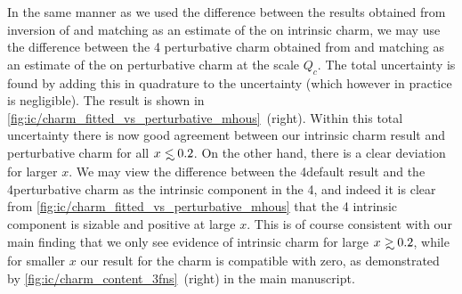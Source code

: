 In the same manner as we used the difference between the results obtained from
inversion of \nnlo and \nnnlo  matching as an estimate of the \mhou on
intrinsic charm, we may use the difference between the 4\fns
 perturbative charm obtained from \nnlo and \nnnlo matching as an
 estimate of the \mhou on perturbative charm at the scale $Q_c$.
 The total uncertainty is found by adding
 this in quadrature to the \pdf uncertainty (which however in practice
 is negligible).
%
The result is shown in 
\cref{fig:ic/charm_fitted_vs_perturbative_mhous}~(right).
Within this total uncertainty there is now good agreement between our
intrinsic charm result and perturbative charm for all
$x\lsim 0.2$. On the other hand, there is a clear deviation for larger
$x$. We may view the difference between the 4\fns default result
and the 4\fns perturbative  charm as the intrinsic component in the
4\fns, and indeed it is clear from
\cref{fig:ic/charm_fitted_vs_perturbative_mhous} that the 4\fns
intrinsic component is sizable and positive at large $x$.
%
This is of course consistent with our main finding that we
only see evidence of intrinsic charm for large $x\gsim 0.2$, while for
smaller $x$ our result for the charm \pdf is compatible with zero, as demonstrated by
\cref{fig:ic/charm_content_3fns}~(right) in the main manuscript.

